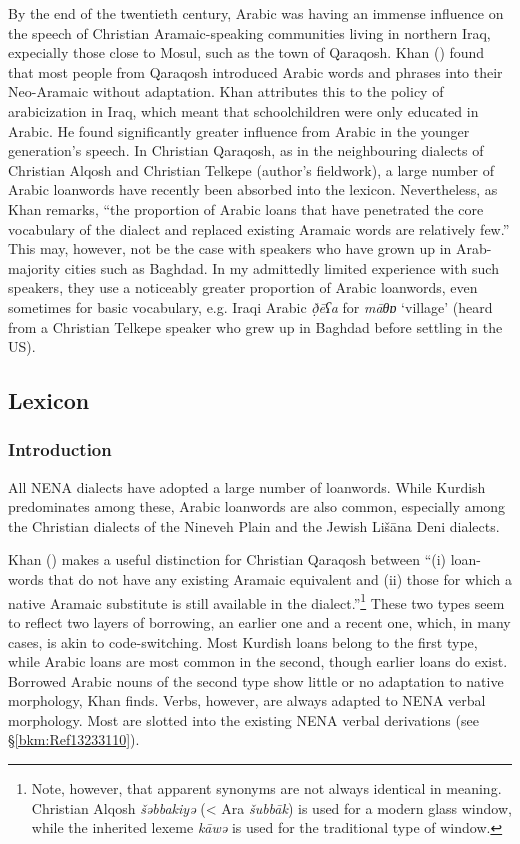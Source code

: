 \documentclass[output=paper]{langsci/langscibook}
\begin{document}
By the end of the twentieth century, Arabic was having an immense influence on the speech of Christian Aramaic-speaking communities living in northern Iraq, expecially those close to Mosul, such as the town of Qaraqosh. Khan (\citeyear[9]{Khan2002}) found that most people from Qaraqosh introduced Arabic words and phrases into their Neo-Aramaic without adaptation.  Khan attributes this to the policy of arabicization in Iraq, which meant that schoolchildren were only educated in Arabic. He found significantly greater influence from Arabic in the younger generation’s speech. In Christian Qaraqosh, as in the neighbouring dialects of Christian Alqosh and Christian Telkepe (author’s fieldwork), a large number of Arabic loanwords have recently been absorbed into the lexicon. Nevertheless, as Khan remarks, “the proportion of Arabic loans that have penetrated the core vocabulary of the dialect and replaced existing Aramaic words are relatively few.” This may, however, not be the case with speakers who have grown up in Arab-majority cities such as Baghdad. In my admittedly limited experience with such speakers, they use a noticeably greater proportion of Arabic loanwords, even sometimes for basic vocabulary, e.g. Iraqi Arabic \textit{ð̣ēʕa} for \textit{māθɒ} ‘village’ (heard from a Christian Telkepe speaker who grew up in Baghdad before settling in the US).

\subsection{Lexicon}
\subsubsection{\label{bkm:Ref13232790}Introduction}

All NENA dialects have adopted a large number of loanwords. While Kurdish predominates among these, Arabic loanwords are also common, especially among the Christian dialects of the Nineveh Plain and the Jewish Lišāna Deni dialects.

 Khan (\citeyear[516]{Khan2002}) makes a useful distinction for Christian Qaraqosh between “(i) loan-words that do not have any existing Aramaic equivalent and (ii) those for which a native Aramaic substitute is still available in the dialect.”\footnote{Note, however, that apparent synonyms are not always identical in meaning. Christian Alqosh \textit{šəbbakiyə} (< Ara \textit{šubbāk}) is used for a modern glass window, while the inherited lexeme \textit{kāwə} is used for the traditional type of window.} These two types seem to reflect two layers of borrowing, an earlier one and a recent one, which, in many cases, is akin to code-switching. Most Kurdish loans belong to the first type, while Arabic loans are most common in the second, though earlier loans do exist. Borrowed Arabic nouns of the second type show little or no adaptation to native morphology, Khan finds. Verbs, however, are always adapted to NENA verbal morphology. Most are slotted into the existing NENA verbal derivations (see §\ref{bkm:Ref13233110}).
\end{document}
